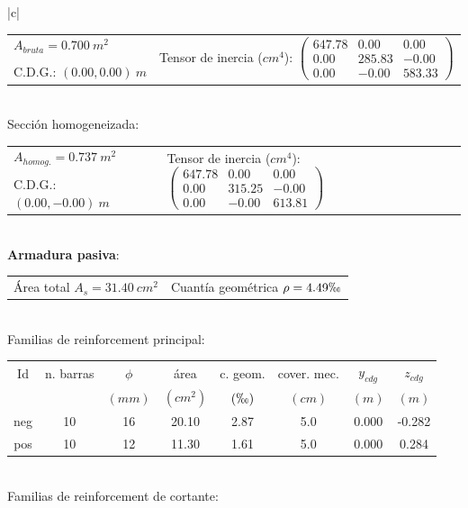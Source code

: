 \begin{table}
\begin{center}
\begin{tabular}{|c|}
\hline
\begin{tabular}{ll}
$A_{bruta}= 0.700\ m^2$ & \multirow{3}{*}{Tensor de inercia ($cm^4$): $ \left( \begin{array}{ccc}647.78 & 0.00 & 0.00 \\ 0.00 & 285.83 & -0.00 \\ 0.00 & -0.00 & 583.33 \end{array} \right)$} \\
& \\
C.D.G.: $( 0.00, 0.00)\ m$  & \\
\end{tabular} \\
\hline
Sección homogeneizada:\\
\hline
\begin{tabular}{ll}
$A_{homog.}= 0.737\ m^2$ & \multirow{3}{*}{Tensor de inercia ($cm^4$): $ \left( \begin{array}{ccc}647.78 & 0.00 & 0.00 \\ 0.00 & 315.25 & -0.00 \\ 0.00 & -0.00 & 613.81 \end{array} \right)$} \\
& \\
C.D.G.: $( 0.00,-0.00)\ m$  & \\
\end{tabular} \\
\hline
\textbf{Armadura pasiva}:\\
\hline
\begin{tabular}{ll}
Área total $A_s=31.40\ cm^2$ & Cuantía geométrica $\rho= 4.49\permil$\\
\end{tabular} \\
\hline
Familias de reinforcement principal:\\
\hline
\begin{tabular}{cccccccc}
Id & n. barras & $\phi$ & área & c. geom. & cover. mec. & $y_{cdg}$ & $z_{cdg}$\\
 &  & $(mm)$ & $(cm^2)$ & $(\permil)$ & $(cm)$ & $(m)$ & $(m)$\\
\hline
neg & 10 & 16 & 20.10 & 2.87 &  5.0 & 0.000 & -0.282\\
\hline
pos & 10 & 12 & 11.30 & 1.61 &  5.0 & 0.000 & 0.284\\
\end{tabular} \\
\hline
Familias de reinforcement de cortante:\\
\hline
\begin{tabular}{cccccccc}

\end{tabular}
\end{tabular}
\end{center}
\end{table}
